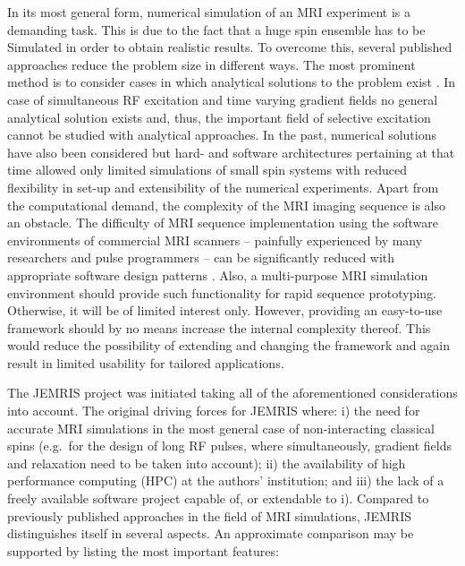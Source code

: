 \documentclass[journal,onecolumn,12pt]{IEEEtran}
\begin{document}
In its most general form, numerical simulation of an MRI experiment is a demanding task. This is due to the fact that a
huge spin ensemble has to be Simulated in order to obtain realistic results. To overcome this, several published
approaches reduce the problem size in different ways. The most prominent method is to consider cases in which analytical
solutions to the problem exist \cite{kwan,benoit,yoder}. In case of simultaneous RF excitation and time varying gradient
fields no general analytical solution exists and, thus, the important field of selective excitation cannot be studied
with analytical approaches. In the past, numerical solutions have also been considered \cite{summers,olsson} but hard-
and software architectures pertaining at that time allowed only limited simulations of small spin systems with reduced
flexibility in set-up and extensibility of the numerical experiments. Apart from the computational demand, the
complexity of the MRI imaging sequence is also an obstacle. The difficulty of MRI sequence implementation using the
software environments of commercial MRI scanners -- painfully experienced by many researchers and pulse programmers --
can be significantly reduced with appropriate software design patterns \cite{joch}. Also, a multi-purpose MRI
simulation environment should provide such functionality for rapid sequence prototyping. Otherwise, it will be of
limited interest only. However, providing an easy-to-use framework should by no means increase the internal complexity
thereof. This would reduce the possibility of extending and changing the framework and again result in limited usability
for tailored applications. 

The JEMRIS project was initiated taking all of the aforementioned considerations into account. The original driving
forces for JEMRIS where: i) the need for accurate MRI simulations in the most general case of non-interacting classical
spins (e.g.~for the design of long RF pulses, where simultaneously, gradient fields and relaxation need to be taken into
account); ii) the availability of high performance computing (HPC) at the authors' institution; and iii) the lack of a
freely available software project capable of, or extendable to i). Compared to previously published approaches in the
field of MRI simulations, JEMRIS distinguishes itself in several aspects. An approximate comparison may be supported by
listing the most important features:
\end{document}
